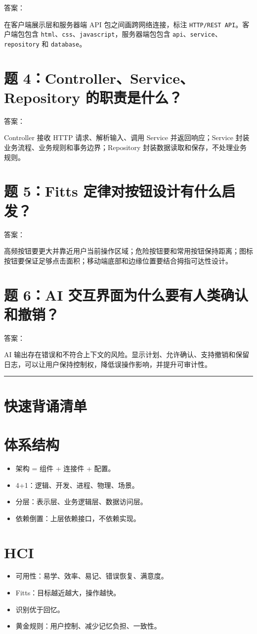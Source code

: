 \documentclass[UTF8,zihao=-4]{ctexart}
\begin{document}
答案：

在客户端展示层和服务器端 API 包之间画跨网络连接，标注 \texttt{HTTP/REST API}。客户端包包含 \texttt{html}、\texttt{css}、\texttt{javascript}，服务器端包包含 \texttt{api}、\texttt{service}、\texttt{repository} 和 \texttt{database}。

\section{题 4：Controller、Service、Repository 的职责是什么？}

答案：

Controller 接收 HTTP 请求、解析输入、调用 Service 并返回响应；Service 封装业务流程、业务规则和事务边界；Repository 封装数据读取和保存，不处理业务规则。

\section{题 5：Fitts 定律对按钮设计有什么启发？}

答案：

高频按钮要更大并靠近用户当前操作区域；危险按钮要和常用按钮保持距离；图标按钮要保证足够点击面积；移动端底部和边缘位置要结合拇指可达性设计。

\section{题 6：AI 交互界面为什么要有人类确认和撤销？}

答案：

AI 输出存在错误和不符合上下文的风险。显示计划、允许确认、支持撤销和保留日志，可以让用户保持控制权，降低误操作影响，并提升可审计性。

\bigskip\hrule\bigskip

\section{快速背诵清单}

\section{体系结构}

\begin{itemize}
\item 架构 = 组件 + 连接件 + 配置。
\item 4+1：逻辑、开发、进程、物理、场景。
\item 分层：表示层、业务逻辑层、数据访问层。
\item 依赖倒置：上层依赖接口，不依赖实现。
\end{itemize}

\section{HCI}

\begin{itemize}
\item 可用性：易学、效率、易记、错误恢复、满意度。
\item Fitts：目标越近越大，操作越快。
\item 识别优于回忆。
\item 黄金规则：用户控制、减少记忆负担、一致性。
\end{itemize}
\end{document}
